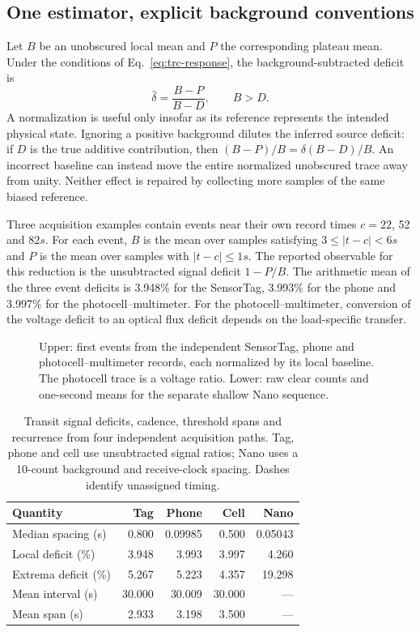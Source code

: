 \subsection{One estimator, explicit background conventions}
Let $B$ be an unobscured local mean and $P$ the corresponding plateau mean. Under the conditions of Eq.~\ref{eq:trc-response}, the background-subtracted deficit is
\begin{equation}
\widehat\delta=\frac{B-P}{B-D},\qquad B>D.
\label{eq:trc-depth}
\end{equation}
A normalization is useful only insofar as its reference represents the intended physical state. Ignoring a positive background dilutes the inferred source deficit: if $D$ is the true additive contribution, then $(B-P)/B=\delta(B-D)/B$. An incorrect baseline can instead move the entire normalized unobscured trace away from unity. Neither effect is repaired by collecting more samples of the same biased reference.

Three acquisition examples contain events near their own record times $c=22$, 52 and $82\unit{s}$. For each event, $B$ is the mean over samples satisfying $3\leq|t-c|<6\unit{s}$ and $P$ is the mean over samples with $|t-c|\leq1\unit{s}$. The reported observable for this reduction is the unsubtracted signal deficit $1-P/B$. The arithmetic mean of the three event deficits is 3.948\% for the SensorTag, 3.993\% for the phone and 3.997\% for the photocell--multimeter. For the photocell--multimeter, conversion of the voltage deficit to an optical flux deficit depends on the load-specific transfer.

\begin{figure}[t]
\centering
\caption{Upper: first events from the independent SensorTag, phone and photocell--multimeter records, each normalized by its local baseline. The photocell trace is a voltage ratio. Lower: raw clear counts and one-second means for the separate shallow Nano sequence.}
\label{fig:trc-paths}
\end{figure}

\begin{table}[t]
\caption{Transit signal deficits, cadence, threshold spans and recurrence from four independent acquisition paths. Tag, phone and cell use unsubtracted signal ratios; Nano uses a 10-count background and receive-clock spacing. Dashes identify unassigned timing.}
\label{tab:trc-paths}
\centering\footnotesize\setlength{\tabcolsep}{3pt}
\begin{tabular}{@{}lrrrr@{}}\toprule
Quantity & Tag & Phone & Cell & Nano\\\midrule
Median spacing (s)&0.800&0.09985&0.500&0.05043\\
Local deficit (\%)&3.948&3.993&3.997&4.260\\
Extrema deficit (\%)&5.267&5.223&4.357&19.298\\
Mean interval (s)&30.000&30.009&30.000&---\\
Mean span (s)&2.933&3.198&3.500&---\\\bottomrule
\end{tabular}
\end{table}

